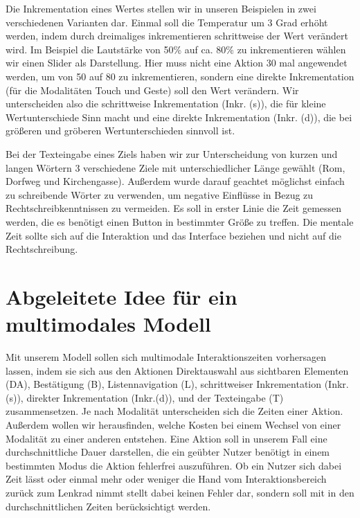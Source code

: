 Die Inkrementation eines Wertes stellen wir in unseren Beispielen in zwei verschiedenen Varianten dar. 
Einmal soll die Temperatur um 3 Grad erhöht werden, indem durch dreimaliges inkrementieren schrittweise der Wert verändert wird. 
Im Beispiel die Lautstärke von 50\% auf ca. 80\% zu inkrementieren wählen wir einen Slider als Darstellung. 
Hier muss nicht eine Aktion 30 mal angewendet werden, um von 50 auf 80 zu inkrementieren, sondern eine direkte Inkrementation (für die Modalitäten Touch und Geste) soll den Wert verändern. 
Wir unterscheiden also die schrittweise Inkrementation (Inkr. (s)), die für kleine Wertunterschiede Sinn macht und eine direkte Inkrementation (Inkr. (d)), die bei größeren und gröberen Wertunterschieden sinnvoll ist.

Bei der Texteingabe eines Ziels haben wir zur Unterscheidung von kurzen und langen Wörtern 3 verschiedene Ziele mit unterschiedlicher Länge gewählt (Rom, Dorfweg und Kirchengasse). 
Außerdem wurde darauf geachtet möglichst einfach zu schreibende Wörter zu verwenden, um negative Einflüsse in Bezug zu Rechtschreibkenntnissen zu vermeiden. 
Es soll in erster Linie die Zeit gemessen werden, die es benötigt einen Button in bestimmter Größe zu treffen. 
Die mentale Zeit sollte sich auf die Interaktion und das Interface beziehen und nicht auf die Rechtschreibung. 
\section[Idee des Modells]{Abgeleitete Idee für ein multimodales Modell}
Mit unserem Modell sollen sich multimodale Interaktionszeiten vorhersagen lassen, indem sie sich aus den Aktionen Direktauswahl aus sichtbaren Elementen (DA), Bestätigung (B), Listennavigation (L), schrittweiser Inkrementation (Inkr.(s)), direkter Inkrementation (Inkr.(d)), und der Texteingabe (T) zusammensetzen. 
Je nach Modalität unterscheiden sich die Zeiten einer Aktion. 
Außerdem wollen wir herausfinden, welche Kosten bei einem Wechsel von einer Modalität zu einer anderen entstehen. 
Eine Aktion soll in unserem Fall eine durchschnittliche Dauer darstellen, die ein geübter Nutzer benötigt in einem bestimmten Modus die Aktion fehlerfrei auszuführen. 
Ob ein Nutzer sich dabei Zeit lässt oder einmal mehr oder weniger die Hand vom Interaktionsbereich zurück zum Lenkrad nimmt stellt dabei keinen Fehler dar, sondern soll mit in den durchschnittlichen Zeiten berücksichtigt werden. 

